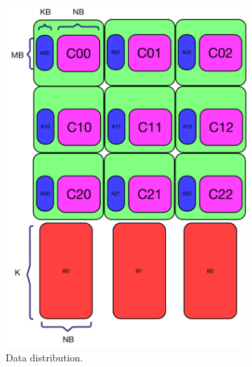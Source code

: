\begin{figure}[b!]
  \centering
  \begin{subfigure}{0.40\columnwidth}
    \includegraphics[width=\linewidth]{figures/gemm_A_C_memory_summa/1.pdf}
    \caption{Data distribution.}
    \label{fig:gemm_summa_1}
  \end{subfigure}
  \hfill
  \begin{subfigure}{0.40\columnwidth}

\end{subfigure}
\end{figure}
